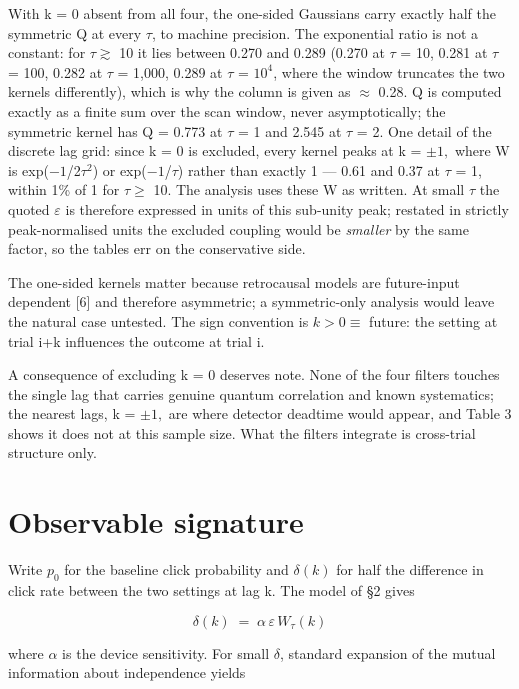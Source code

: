 \documentclass[
  11pt,
]{article}
\begin{document}
With k = 0 absent from all four, the one-sided Gaussians carry exactly
half the symmetric Q at every \(\tau\), to machine precision. The
exponential ratio is not a constant: for \(\tau \gtrsim\) 10 it lies
between 0.270 and 0.289 (0.270 at \(\tau\) = 10, 0.281 at \(\tau\) =
100, 0.282 at \(\tau\) = 1,000, 0.289 at \(\tau\) = \(10^{4}\), where
the window truncates the two kernels differently), which is why the
column is given as \(\approx\) 0.28. Q is computed exactly as a finite
sum over the scan window, never asymptotically; the symmetric kernel has
Q = 0.773 at \(\tau\) = 1 and 2.545 at \(\tau\) = 2. One detail of the
discrete lag grid: since k = 0 is excluded, every kernel peaks at k =
\(\pm 1,\) where W is exp(\(-1\)/2\(\tau^{2}\)) or exp(\(-1\)/\(\tau\))
rather than exactly 1 --- 0.61 and 0.37 at \(\tau\) = 1, within 1\% of 1
for \(\tau \ge\) 10. The analysis uses these W as written. At small
\(\tau\) the quoted \(\varepsilon\) is therefore expressed in units of
this sub-unity peak; restated in strictly peak-normalised units the
excluded coupling would be \emph{smaller} by the same factor, so the
tables err on the conservative side.

The one-sided kernels matter because retrocausal models are future-input
dependent {[}6{]} and therefore asymmetric; a symmetric-only analysis
would leave the natural case untested. The sign convention is
\(k>0 \equiv\) future: the setting at trial i+k influences the outcome
at trial i.

A consequence of excluding k = 0 deserves note. None of the four filters
touches the single lag that carries genuine quantum correlation and
known systematics; the nearest lags, k = \(\pm 1,\) are where detector
deadtime would appear, and Table 3 shows it does not at this sample
size. What the filters integrate is cross-trial structure only.

\section{Observable signature}

Write \(p_{0}\) for the baseline click probability and \(\delta(k)\) for
half the difference in click rate between the two settings at lag k. The
model of \S2 gives

\begin{equation}
\delta(k) \;=\; \alpha\,\varepsilon\,W_\tau(k)
\label{eq:delta}
\end{equation}

where \(\alpha\) is the device sensitivity. For small \(\delta\),
standard expansion of the mutual information about independence yields
\end{document}

